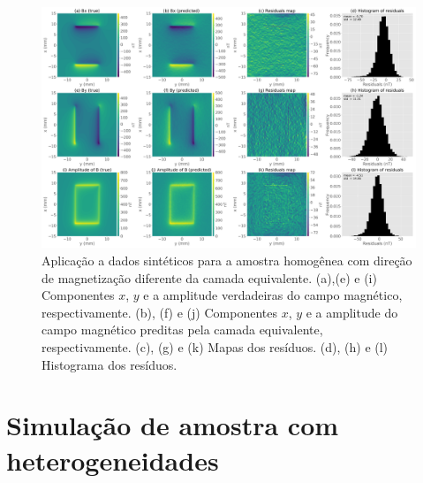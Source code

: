 \begin{figure}
	\centering
	\includegraphics[width=1.15\textwidth]{Fig/mag_vec/amostra_homo_errado/comparison_true_estimated.png}
	\caption{Aplicação a dados sintéticos para a amostra homogênea com direção de magnetização diferente da camada equivalente. (a),(e) e (i) Componentes $x$, $y$ e a amplitude verdadeiras do campo magnético, respectivamente. (b), (f) e (j) Componentes $x$, $y$ e a amplitude do campo magnético preditas pela camada equivalente, respectivamente. (c), (g) e (k) Mapas dos resíduos. (d), (h) e (l) Histograma dos resíduos.}
	\label{fig:comparison_homo_sample_difdir}
\end{figure}


\section{Simulação de amostra com heterogeneidades}
\label{sec:hetero_sample}

